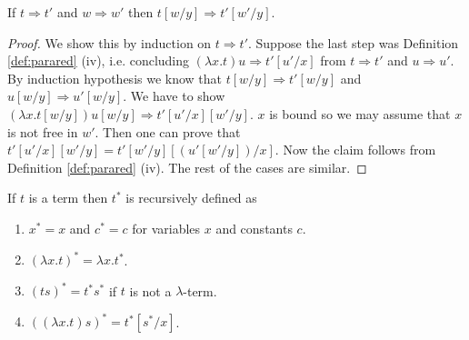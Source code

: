 \begin{boxlem} \label{lem:arrowsubst}
    If $t \Rightarrow t'$ and $w \Rightarrow w'$ then $t[w/y] \Rightarrow t'[w'/y]$.
\end{boxlem}
\begin{proof}
    We show this by induction on $t \Rightarrow t'$.
    Suppose the last step was Definition \ref{def:parared} (iv), i.e. concluding $(\lambda x.t)u \Rightarrow t'[u'/x]$ from $t \Rightarrow t'$ and $u \Rightarrow u'$.
    By induction hypothesis we know that $t[w/y] \Rightarrow t'[w/y]$ and $u[w /y] \Rightarrow u'[w/y]$.
    We have to show $(\lambda x.t [w/y])u[w/y] \Rightarrow t'[u'/x][w'/y]$.
    $x$ is bound so we may assume that $x$ is not free in $w'$.
    Then one can prove that $t'[u'/x][w'/y] = t'[w'/y][(u'[w'/y])/x]$.
    Now the claim follows from Definition \ref{def:parared} (iv).
    The rest of the cases are similar.
\end{proof}

\begin{boxdefi} \label{def:star}
    If $t$ is a term then \alert{$t^*$} is recursively defined as
    \begin{enumerate}
        \item $x^* = x$ and $c^* = c$ for variables $x$ and constants $c$.
        \item $(\lambda x.t)^* = \lambda x. t^*$.
        \item $(ts)^* = t^*s^*$ if $t$ is not a $\lambda$-term.
        \item $((\lambda x.t) s)^* = t^*[s^*/x]$.
    \end{enumerate}
\end{boxdefi}


